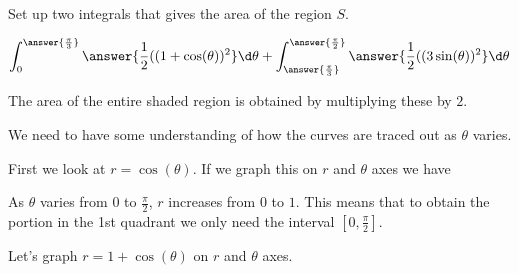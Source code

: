 \documentclass{ximera}
\begin{document}
\begin{exercise}
\begin{multipleChoice}
\end{multipleChoice}


\begin{exercise}

Set up two integrals that gives the area of the region $S$. 


\[
\int_{0}^{\answer{ \frac{\pi}{3} } } \answer{ \frac{1}{2}((1+\cos(\theta))^2   } \d \theta +  \int_{\answer{\frac{\pi}{3}}}^{\answer{\frac{\pi}{2}}} \answer{ \frac{1}{2} ( (3\sin(\theta))^2 } \d \theta
\]

The area of the entire shaded region is obtained by multiplying these by $2$. 


\begin{hint}








We need to have some understanding of how the curves are traced out as $\theta$ varies. 

First we look at $r=\cos(\theta)$. If we graph this on $r$ and $\theta$ axes we have


\begin{image}  
\end{image} 


As $\theta$ varies from $0$ to $\frac{\pi}{2}$, $r$ increases from $0$ to $1$. This means that to obtain the portion in the 1st quadrant we only need the interval $[0, \frac{\pi}{2}]$. 


Let's graph $r=1+\cos(\theta)$ on $r$ and $\theta$ axes. 


\end{hint}
\end{exercise}
\end{exercise}
\end{document}
